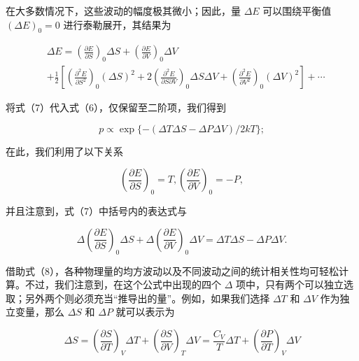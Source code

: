 在大多数情况下，这些波动的幅度极其微小；因此，量 \(\Delta E\) 可以围绕平衡值 \((\Delta E)_0 = 0\) 进行泰勒展开，其结果为

\begin{equation}\tag{15.1.7}\label{eq:15.1.7}
\begin{array}{rl} & { \Delta E = \left( \frac { \partial E } { \partial S } \right) _ { 0 } \Delta S + \left( \frac { \partial E } { \partial V } \right) _ { 0 } \Delta V } \\& {  + \frac { 1 } { 2 } \left[ \left( \frac { \partial ^{2} E } { \partial S ^{2} } \right) _ { 0 } ( \Delta S ) ^{2} + 2 \left( \frac { \partial ^{2} E } { \partial S \partial V } \right) _ { 0 } \Delta S \Delta V + \left( \frac { \partial ^{2} E } { \partial V ^{2} } \right) _ { 0 } ( \Delta V ) ^{2} \right] + \cdots } \end{array}
\end{equation}

将式（7）代入式（6），仅保留至二阶项，我们得到

\begin{equation}\tag{15.1.8}\label{eq:15.1.8}
p \propto \exp \{ - ( \Delta T \Delta S - \Delta P \Delta V ) / 2 k T \} ;
\end{equation}

在此，我们利用了以下关系

\begin{equation}\tag{15.1.9}\label{eq:15.1.9}
\left( \frac { \partial E } { \partial S } \right) _ { 0 } = T ,  \left( \frac { \partial E } { \partial V } \right) _ { 0 } = - P ,
\end{equation}

并且注意到，式（7）中括号内的表达式与

\begin{equation}\tag{15.1.10}\label{eq:15.1.10}
\Delta \left( \frac { \partial E } { \partial S } \right) _ { 0 } \Delta S + \Delta \left( \frac { \partial E } { \partial V } \right) _ { 0 } \Delta V = \Delta T \Delta S - \Delta P \Delta V .
\end{equation}

借助式（8），各种物理量的均方波动以及不同波动之间的统计相关性均可轻松计算。不过，我们注意到，在这个公式中出现的四个 \(\Delta\) 项中，只有两个可以独立选取；另外两个则必须充当``推导出的量''。例如，如果我们选择 \(\Delta T\) 和 \(\Delta V\) 作为独立变量，那么 \(\Delta S\) 和 \(\Delta P\) 就可以表示为

\begin{equation}\tag{15.1.11}\label{eq:15.1.11}
\Delta S = \left( \frac { \partial S } { \partial T } \right) _ { V } \Delta T + \left( \frac { \partial S } { \partial V } \right) _ { T } \Delta V = \frac { C _ { V } } { T } \Delta T + \left( \frac { \partial P } { \partial T } \right) _ { V } \Delta V
\end{equation}

